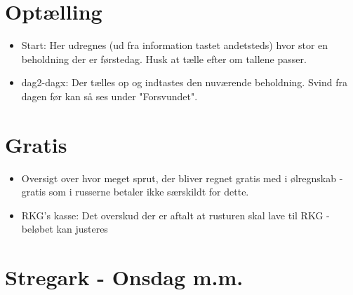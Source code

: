 \documentclass[11pt]{article} %
\begin{document}
\section*{Optælling}

\begin{itemize}

\item Start: Her udregnes (ud fra information tastet andetsteds) hvor stor en beholdning der er førstedag. Husk at tælle efter om tallene passer.

\item dag2-dagx: Der tælles op og indtastes den nuværende beholdning. Svind fra dagen før kan så ses under "Forsvundet".

\end{itemize}

\section*{Gratis}

\begin{itemize}

\item Oversigt over hvor meget sprut, der bliver regnet gratis med i ølregnskab - gratis som i russerne betaler ikke særskildt for dette.

\item RKG’s kasse: Det overskud der er aftalt at rusturen skal lave til RKG - beløbet kan justeres

\end{itemize}

\section*{Stregark - Onsdag m.m.}
\end{document}
